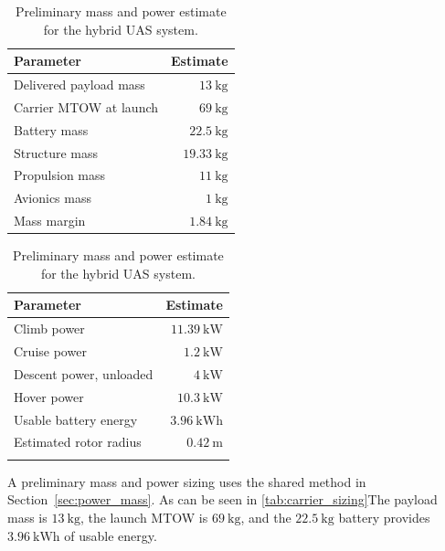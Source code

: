 \begin{table}[H]
\centering
\small
\caption{Preliminary mass and power estimate for the hybrid UAS system.}
\label{tab:carrier_sizing}

\begin{minipage}[t]{0.48\textwidth}
\centering
\begin{tabularx}{\linewidth}{@{}X r@{}}
\hline
Parameter & Estimate \\
\hline
Delivered payload mass & $13~\mathrm{kg}$ \\
Carrier MTOW at launch & $69~\mathrm{kg}$ \\
Battery mass & $22.5~\mathrm{kg}$ \\
Structure mass & $19.33~\mathrm{kg}$ \\
Propulsion mass & $11~\mathrm{kg}$ \\
Avionics mass & $1~\mathrm{kg}$ \\
Mass margin & $1.84~\mathrm{kg}$ \\
\hline
\end{tabularx}
\end{minipage}
\hfill
\begin{minipage}[t]{0.48\textwidth}
\centering
\begin{tabularx}{\linewidth}{@{}X r@{}}
\hline
Parameter & Estimate \\
\hline
Climb power & $11.39~\mathrm{kW}$ \\
Cruise power & $1.2~\mathrm{kW}$ \\
Descent power, unloaded & $4~\mathrm{kW}$ \\
Hover power & $10.3~\mathrm{kW}$\\
Usable battery energy & $3.96~\mathrm{kWh}$ \\
Estimated rotor radius & $0.42~\mathrm{m}$ \\
\\[-0.9em]
\hline
\end{tabularx}
\end{minipage}

\end{table}

A preliminary mass and power sizing uses the shared method in
Section~\ref{sec:power_mass}. As can be seen in \autoref{tab:carrier_sizing}The payload mass is \(13~\mathrm{kg}\),
the launch MTOW is \(69~\mathrm{kg}\), and the \(22.5~\mathrm{kg}\)
battery provides \(3.96~\mathrm{kWh}\) of usable energy.


